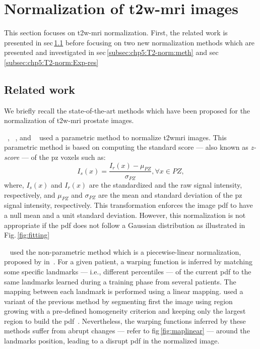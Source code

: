 \section{Normalization of \ac{t2w}-\ac{mri} images} \label{sec:chp5:T2-norm}

This section focuses on \ac{t2w}-\ac{mri} normalization.
First, the related work is presented in \ac{sec}\,\ref{subsec:chp5:relwork1} before focusing on two new normalization methods which are presented and investigated in \acs{sec}\,\ref{subsec:chp5:T2-norm:meth} and \acs{sec}\,\ref{subsec:chp5:T2-norm:Exp-res}

\subsection{Related work}\label{subsec:chp5:relwork1}

We briefly recall the state-of-the-art methods which have been proposed for the normalization of \ac{t2w}-\ac{mri} prostate images.

\citeauthor{Artan2010}~\cite{Artan2009,Artan2010}, \citeauthor{Ozer2010}~\cite{Ozer2009,Ozer2010}, and \citeauthor{rampun2016computerb}~\cite{rampun2015classifying,rampun2015computer,rampun2016computer,rampun2016computerb} used a parametric method to normalize \ac{t2w}\ac{mri} images.
This parametric method is based on computing the standard score --- also known as \emph{z-score} --- of the \ac{pz} voxels such as: 
\begin{equation}
  I_{s}(x) = \frac{I_{r}(x) - \mu_{PZ}}{\sigma_{PZ}}, \forall x\in PZ ,
  \label{eq:zscore}
\end{equation}
\noindent where, $I_{s}(x)$ and $I_{r}(x)$ are the standardized and the raw signal intensity, respectively, and $\mu_{PZ}$ and $\sigma_{PZ}$ are the mean and standard deviation of the \ac{pz} signal intensity, respectively. 
This transformation enforces the image \ac{pdf} to have a null mean and a unit standard deviation.
However, this normalization is not appropriate if the \ac{pdf} does not follow a Gaussian distribution as illustrated in Fig.\,\ref{fig:fitting}

\citeauthor{Lv2009}~\cite{Lv2009} used the non-parametric method which is a piecewise-linear normalization, proposed by \citeauthor{Nyul2000} in~\cite{Nyul2000}.
For a given patient, a warping function is inferred by matching some specific landmarks --- i.e., different percentiles --- of the current \ac{pdf} to the same landmarks learned during a training phase from several patients. 
The mapping between each landmark is performed using a linear mapping.
\citeauthor{Viswanath2012} used a variant of the previous method by segmenting first the image using region growing with a pre-defined homogeneity criterion and keeping only the largest region to build the \ac{pdf}~\cite{Viswanath2012}.
Nevertheless, the warping functions inferred by these methods suffer from abrupt changes --- refer to \acs{fig}\,\ref{fig:maplinear} --- around the landmarks position, leading to a disrupt \ac{pdf} in the normalized image.

